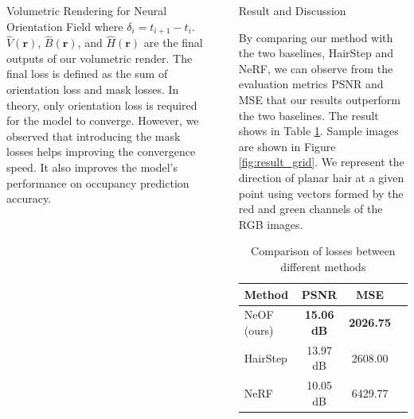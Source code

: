 \documentclass[final]{beamer}
\newlength{\sepwidth}
\newlength{\colwidth}
\newcommand{\separatorcolumn}{\begin{column}{\sepwidth}\end{column}}
\begin{document}
\begin{frame}[t]
\begin{columns}[t]
\begin{column}{\colwidth}
\begin{alertblock}{Volumetric Rendering for Neural Orientation Field}
    where $\delta_{i} = t_{i + 1} - t_{i}$. $\hat{V}(\mathbf{r})$, $\hat{B}(\mathbf{r})$, and $\hat{H}(\mathbf{r})$ are the final outputs of our volumetric render. The final loss is defined as the sum of orientation loss and mask losses. In theory, only orientation loss is required for the model to converge. However, we observed that introducing the mask losses helps improving the convergence speed. It also improves the model's performance on occupancy prediction accuracy.

  \end{alertblock}

\end{column}

\separatorcolumn

\begin{column}{\colwidth}

  \begin{block}{Result and Discussion}

    By comparing our method with the two baselines, HairStep \cite{zheng_hairstep_2023} and NeRF, we can observe from the evaluation metrics PSNR and MSE that our results outperform the two baselines. The result shows in Table \ref{tab:loss_comparison}. Sample images are shown in Figure \ref{fig:result_grid}. We represent the direction of planar hair at a given point using vectors formed by the red and green channels of the RGB images.
    
    \begin{table}[h]
    \centering
    \begin{tabular}{lccc}
    \toprule
    \textbf{Method} & \textbf{PSNR} & \textbf{MSE} \\ 
    \midrule
    NeOF (ours) & \textbf{15.06 dB} & \textbf{2026.75} \\
    HairStep & 13.97 dB & 2608.00 \\
    NeRF & 10.05 dB & 6429.77 \\
    \bottomrule
    \end{tabular}
    \caption{Comparison of losses between different methods}
    \label{tab:loss_comparison}
    \end{table}

    \begin{figure}[h]
        \centering
        

\end{figure}
\end{block}
\end{column}
\end{columns}
\end{frame}
\end{document}
